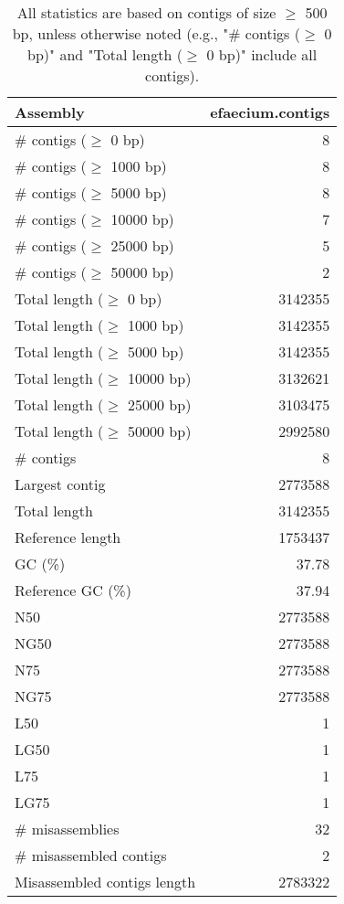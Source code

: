 \documentclass[12pt,a4paper]{article}
\begin{document}
\begin{table}[ht]
\begin{center}
\caption{All statistics are based on contigs of size $\geq$ 500 bp, unless otherwise noted (e.g., "\# contigs ($\geq$ 0 bp)" and "Total length ($\geq$ 0 bp)" include all contigs).}
\begin{tabular}{|l*{1}{|r}|}
\hline
Assembly & efaecium.contigs \\ \hline
\# contigs ($\geq$ 0 bp) & 8 \\ \hline
\# contigs ($\geq$ 1000 bp) & 8 \\ \hline
\# contigs ($\geq$ 5000 bp) & 8 \\ \hline
\# contigs ($\geq$ 10000 bp) & 7 \\ \hline
\# contigs ($\geq$ 25000 bp) & 5 \\ \hline
\# contigs ($\geq$ 50000 bp) & 2 \\ \hline
Total length ($\geq$ 0 bp) & 3142355 \\ \hline
Total length ($\geq$ 1000 bp) & 3142355 \\ \hline
Total length ($\geq$ 5000 bp) & 3142355 \\ \hline
Total length ($\geq$ 10000 bp) & 3132621 \\ \hline
Total length ($\geq$ 25000 bp) & 3103475 \\ \hline
Total length ($\geq$ 50000 bp) & 2992580 \\ \hline
\# contigs & 8 \\ \hline
Largest contig & 2773588 \\ \hline
Total length & 3142355 \\ \hline
Reference length & 1753437 \\ \hline
GC (\%) & 37.78 \\ \hline
Reference GC (\%) & 37.94 \\ \hline
N50 & 2773588 \\ \hline
NG50 & 2773588 \\ \hline
N75 & 2773588 \\ \hline
NG75 & 2773588 \\ \hline
L50 & 1 \\ \hline
LG50 & 1 \\ \hline
L75 & 1 \\ \hline
LG75 & 1 \\ \hline
\# misassemblies & 32 \\ \hline
\# misassembled contigs & 2 \\ \hline
Misassembled contigs length & 2783322 \\ \hline

\end{tabular}
\end{center}
\end{table}
\end{document}
